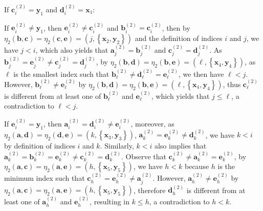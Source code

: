 \documentclass[11pt]{article}
\theoremstyle{definition}
\newcommand{\aaa}{\boldsymbol{a}}
\newcommand{\bb}{\boldsymbol{b}}
\newcommand{\cc}{\boldsymbol{c}}
\newcommand{\dd}{\boldsymbol{d}}
\newcommand{\ee}{\boldsymbol{e}}
\begin{document}
\begin{Case}
    \item If $\cc_{i}^{(2)}=\boldsymbol{y}_{1}$ and $\dd_{i}^{(2)}=\boldsymbol{x}_{1}$: 
    \begin{Case}
        \item If $\ee_{i}^{(2)}\neq\boldsymbol{y}_{1}$, then $\ee_{i}^{(2)}\neq\cc_{i}^{(2)}$ and $\bb_{i}^{(2)}=\cc_{i}^{(2)}$, then by $\eta_{2}(\bb,\cc)=\eta_{2}(\cc,\ee)=(j,\left\{\boldsymbol{x}_{2},\boldsymbol{y}_{2}\right\})$ and the definition of indices $i$ and $j$, we have $j<i$, which also yields that $\aaa_{j}^{(2)}=\bb_{j}^{(2)}$ and $\cc_{j}^{(2)}=\dd_{j}^{(2)}$. As $\bb_{j}^{(2)}=\ee_{j}^{(2)}\neq\cc_{j}^{(2)}=\dd_{j}^{(2)}$, by $\eta_{2}(\bb,\dd)=\eta_{2}(\bb,\ee)=(\ell,\left\{\boldsymbol{x}_{4},\boldsymbol{y}_{4}\right\})$, as $\ell$ is the smallest index such that $\bb_{\ell}^{(2)}\neq \dd_{\ell}^{(2)}= \ee_{\ell}^{(2)}$, we then have $\ell<j$. However, $\bb_{\ell}^{(2)}\neq \ee_{\ell}^{(2)}$ by $\eta_{2}(\bb,\dd)=\eta_{2}(\bb,\ee)=(\ell,\left\{\boldsymbol{x}_{4},\boldsymbol{y}_{4}\right\})$, thus $\cc_{\ell}^{(2)}$ is different from at least one of $\bb_{\ell}^{(2)}$ and $\ee_{\ell}^{(2)}$, which yields that $j\le \ell$, a contradiction to $\ell<j$.
        
        \item If $\ee_{i}^{(2)}=\boldsymbol{y}_{1}$, then $\aaa_{i}^{(2)}=\dd_{i}^{(2)}\neq \ee_{i}^{(2)}$, moreover, as $\eta_{2}(\aaa,\dd)=\eta_{2}(\dd,\ee)=(k,\left\{\boldsymbol{x}_{3},\boldsymbol{y}_{3}\right\})$, $\aaa_{k}^{(2)}=\ee_{k}^{(2)}\neq\dd_{k}^{(2)}$, we have $k<i$ by definition of indices $i$ and $k$. Similarly, $k<i$ also implies that $\aaa_{k}^{(2)}=\bb_{k}^{(2)}=\ee_{k}^{(2)}\neq \cc_{k}^{(2)}=\dd_{k}^{(2)}$. Observe that $\cc_{k}^{(2)}\neq\aaa_{k}^{(2)}=\ee_{k}^{(2)}$, by $\eta_{2}(\aaa,\cc)=\eta_{2}(\aaa,\ee)=(h,\left\{\boldsymbol{x}_{5},\boldsymbol{y}_{5}\right\})$, we have $h<k$ because $h$ is the minimum index such that $\cc_{h}^{(2)}=\ee_{h}^{(2)}\neq\aaa_{j}^{(2)}$. However, $\aaa_{h}^{(2)}\neq\ee_{h}^{(2)}$ by $\eta_{2}(\aaa,\cc)=\eta_{2}(\aaa,\ee)=(h,\left\{\boldsymbol{x}_{5},\boldsymbol{y}_{5}\right\})$, therefore $\dd_{h}^{(2)}$ is different from at least one of $\aaa_{h}^{(2)}$ and $\ee_{h}^{(2)}$, resulting in $k\le h$, a contradiction to $h<k$.
    \end{Case}
\end{Case}


 
\end{document}
